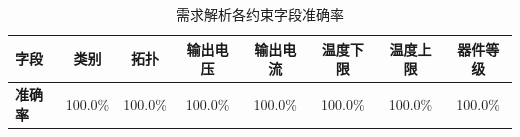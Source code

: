 \begin{table}[htbp]
\centering
\caption{需求解析各约束字段准确率}
\label{tab:parse_accuracy}
\footnotesize
\setlength{\tabcolsep}{8pt}
\renewcommand{\arraystretch}{0.9}
\begin{tabular*}{\textwidth}{@{\extracolsep{\fill}}lccccccc@{}}
\toprule
\textbf{字段} & \textbf{类别} & \textbf{拓扑} & \textbf{输出电压} & \textbf{输出电流} & \textbf{温度下限} & \textbf{温度上限} & \textbf{器件等级} \\
\midrule
\textbf{准确率} & 100.0\% & 100.0\% & 100.0\% & 100.0\% & 100.0\% & 100.0\% & 100.0\% \\
\bottomrule
\end{tabular*}
\end{table}
